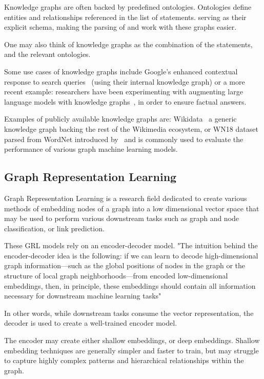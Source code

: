 Knowledge graphs are often backed by predefined ontologies.
Ontologies define entities and relationships referenced in the list of statements.
serving as their explicit schema, making the parsing of and
work with these graphs easier.

One may also think of knowledge graphs as the combination of the statements, and the relevant ontologies.

Some use cases of knowledge graphs include Google's enhanced contextual response to search queries~\cite{GoogleKnowledgeGraph} (using their internal
knowledge graph) or a more recent example: researchers have been experimenting with augmenting large language models
with knowledge graphs~\cite{LLMKG}, in order to ensure factual answers.

Examples of publicly available knowledge graphs are: Wikidata~\cite{Wikidata} a generic
knowledge graph backing the rest of the Wikimedia ecosystem, or WN18 dataset parsed from WordNet
introduced by~\cite{TransE} and is commonly used to evaluate the performance of various graph machine learning models.



\FloatBarrier
\subsection{Graph Representation Learning}\label{subsec:introduction-graph-representation-learning}
Graph Representation Learning is a research field dedicated to create various methods of embedding nodes of a graph into
a low dimensional vector space that may be used to perform various downstream tasks such as graph and node classification, or link prediction.

These GRL models rely on an encoder-decoder model.
"The intuition behind the encoder-decoder idea is the following:
if we can learn to decode high-dimensional graph information—such as the global positions of
nodes in the graph or the structure of local graph neighborhoods—from encoded low-dimensional embeddings, then, in principle,
these embeddings should contain all information necessary for downstream machine learning tasks"~\cite{RLGMandA}

In other words, while downstream tasks consume the vector representation, the decoder is used to create a well-trained encoder model.

The encoder may create either shallow embeddings, or deep embeddings.
Shallow embedding techniques are generally simpler and faster to train, but
may struggle to capture highly complex patterns and hierarchical relationships within the graph.

